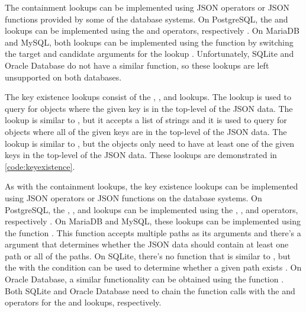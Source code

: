 The containment lookups can be implemented using JSON operators or JSON
functions provided by some of the database systems. On PostgreSQL, the
 and  lookups can be implemented using the
 and  operators, respectively \cite{postgres:json_operators}.
On MariaDB and MySQL, both lookups can be implemented using the
 function by switching the target and candidate arguments
for the  lookup \cite{mariadb:json_contains,
mysql:json_search}. Unfortunately, SQLite and Oracle Database do not have a
similar function, so these lookups are left unsupported on both databases.

\noindent
\begin{minipage}{\linewidth}

\end{minipage}

The key existence lookups consist of the , , and
 lookups. The  lookup is used to query for
objects where the given key is in the top-level of the JSON data. The
 lookup is similar to , but it accepts a list of
strings and it is used to query for objects where all of the given keys are
in the top-level of the JSON data. The  lookup is similar
to , but the objects only need to have at least one of the
given keys in the top-level of the JSON data. These lookups are demonstrated in
\autoref{code:keyexistence}.

As with the containment lookups, the key existence lookups can be implemented
using JSON operators or JSON functions on the database systems. On PostgreSQL,
the , , and  lookups can be
implemented using the , , and  operators,
respectively \cite{postgres:json_operators}. On MariaDB and MySQL, these
lookups can be implemented using the  function
\cite{mariadb:json_contains_path, mysql:json_search}. This function accepts
multiple paths as its arguments and there's a  argument that
determines whether the JSON data should contain at least one path or all of the
paths. On SQLite, there's no function that is similar to
, but the  with the  condition can be used to determine whether a given path exists
\cite{sqlite:json1}. On Oracle Database, a similar functionality can be
obtained using the  function \cite{oracle:json_exists}. Both
SQLite and Oracle Database need to chain the function calls with the 
and  operators for the  and 
lookups, respectively.

